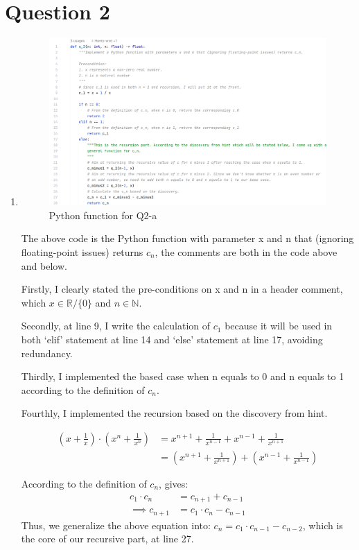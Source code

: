 \documentclass[12pt]{article}
\newcommand{\mysection}[2]{\setcounter{section}{#1}\addtocounter{section}{-1}\section{Question #1}}
\begin{document}
\mysection{2}{Question 2}
\begin{enumerate}[label=(\alph*)]
    \item
\begin{figure}[h]
    \centering
    \includegraphics[width = 1.0\textwidth]{../tex_pic/q2_3.png}
    \caption{Python function for Q2-a}
\end{figure}

\noindent The above code is the Python function with parameter x and n that (ignoring floating-point issues) returns $c_n$, the comments are both in the code above and below.

\noindent Firstly, I clearly stated the pre-conditions on x and n in a header comment, which $x \in \mathbb{R} / \{0\} $ and $n \in \mathbb{N}$.

\noindent Secondly, at line 9, I write the calculation of $c_1$ because it will be used in both `elif' statement at line 14 and `else' statement at line 17, avoiding redundancy.

\noindent Thirdly, I implemented the based case when n equals to 0 and n equals to 1 according to the definition of $c_n$.

\noindent Fourthly, I implemented the recursion based on the discovery from hint.

\begin{align*}
    (x + \frac{1}{x}) \cdot (x^n + \frac{1}{x^n}) &= x^{n+1} + \frac{1}{x^{n-1}} + x^{n-1} + \frac{1}{x^{n+1}} \\
    &= (x^{n+1} + \frac{1}{x^{n+1}}) + (x^{n-1} + \frac{1}{x^{n-1}})
\end{align*}

\noindent According to the definition of $c_n$, gives:
\begin{align*}
    c_1 \cdot c_n &= c_{n+1} + c_{n-1} \\
    \implies c_{n+1} &= c_1 \cdot c_n - c_{n-1}
\end{align*}
\noindent Thus, we generalize the above equation into: $c_{n} = c_1 \cdot c_{n-1} - c_{n-2} $, which is the core of our recursive part, at line 27.


\end{enumerate}
\end{document}
